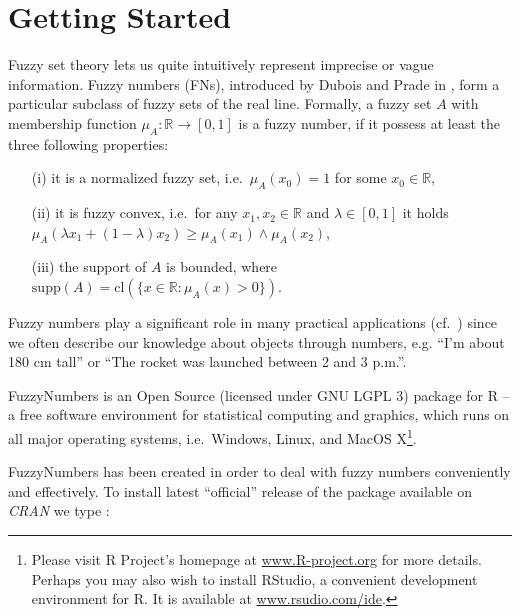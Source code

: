 \documentclass[11pt]{article}\usepackage[]{graphicx}\usepackage[]{color}
\newcommand{\package}[1]{\textsf{#1}\xspace}
\newcommand{\program}[1]{\textsf{#1}\xspace}
\newcommand{\os}[1]{\textsf{#1}\xspace}
\newcommand{\lang}[1]{\textsf{#1}\xspace}
\newcommand{\R}{\lang{R}}
\newif\ifDevelopmentVersion
\begin{document}
\section{Getting Started}

Fuzzy set theory lets us quite intuitively represent
imprecise or vague information. Fuzzy numbers (FNs), introduced
by Dubois and Prade in \cite{DuboisPrade1978:opfn}, form a particular
subclass of fuzzy sets of the real line.
Formally, a fuzzy set $A$
with membership function $\mu_A:\mathbb{R}\to[0,1]$
is a fuzzy number, if it possess at least the three following properties:
\begin{itemize}
\item[(i)] it is a normalized fuzzy set,
i.e.~$\mu_A(x_0)=1$ for some $x_0\in\mathbb{R}$,
\item[(ii)] it is fuzzy convex, i.e.~for any $x_1,x_2\in\mathbb{R}$
and $\lambda\in[0,1]$ it holds
$\mu_A(\lambda x_1 + (1-\lambda) x_2) \ge \mu_A(x_1)\wedge \mu_A(x_2)$,
\item[(iii)] the support of $A$ is bounded,
where $\mathrm{supp}(A) = \mathrm{cl}(\{x\in\mathbb{R}: \mu_A(x)>0\})$.
\end{itemize}
Fuzzy numbers play a significant role
in many practical applications
(cf.~\cite{KlirYuan1995:fuzzybook})
since we often describe our knowledge about objects
through numbers, e.g. ``I'm about 180 cm tall''
or ``The rocket was launched between 2 and 3 p.m.''.




\bigskip
\package{FuzzyNumbers} is an Open Source (licensed under GNU LGPL 3)
package for \R{} -- a free software environment
for statistical computing and graphics, which
runs on all major operating systems, i.e.~\os{Windows},
\os{Linux}, and \os{MacOS X}\footnote{%
Please visit \R Project's homepage at \href{http://www.R-project.org}{www.R-project.org}
for more details.
Perhaps you may also wish to install  \program{RStudio},
a convenient development environment for \R.
It is available at \href{http://www.rstudio.com/ide/}{www.rsudio.com/ide}.}.


\package{FuzzyNumbers} has been created in order to deal with fuzzy numbers
conveniently and effectively.
To install latest ``official'' release of the
package available on \textit{CRAN} we type%
\ifDevelopmentVersion%
\footnote{You are viewing the \textbf{development} version of the tutorial.
Some of the features presented in this document may be missing
in the current \textit{CRAN} release. Please, upgrade to the \textbf{latest} development version from
\href{https://github.com/Rexamine/FuzzyNumbers}{\textit{GitHub}}
if you need the new functionality.}\ignorespaces
\fi%
:
\end{document}
